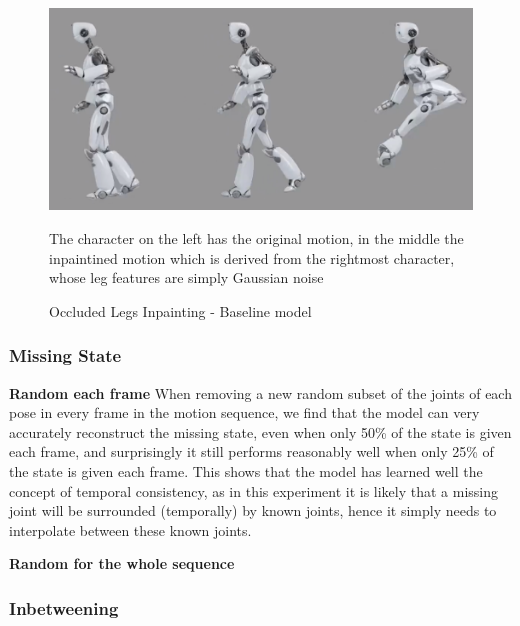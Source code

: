 \begin{figure}[!ht]
    \centering
    \includegraphics[width=1\textwidth]{Figures/diffusion/results/basline_inpainting_legs.png}
    \caption{Occluded Legs Inpainting - Baseline model}
    \label{fig:baseline_occluded_legs}
    \medskip
    \small
    The character on the left has the original motion, in the middle the inpaintined motion which is derived from the rightmost character, whose leg features are simply Gaussian noise
\end{figure}


\subsubsection{Missing State}
\textbf{Random each frame}
When removing a new random subset of the joints of each pose in every frame in the motion sequence, we find that the model can very accurately reconstruct the missing state, even when only 50\% of the state is given each frame, and surprisingly it still performs reasonably well when only 25\% of the state is given each frame. This shows that the model has learned well the concept of temporal consistency, as in this experiment it is likely that a missing joint will be surrounded (temporally) by known joints, hence it simply needs to interpolate between these known joints.


\textbf{Random for the whole sequence}


\subsubsection{Inbetweening}
\label{sec:diffusion_baseline_inbetweening}

